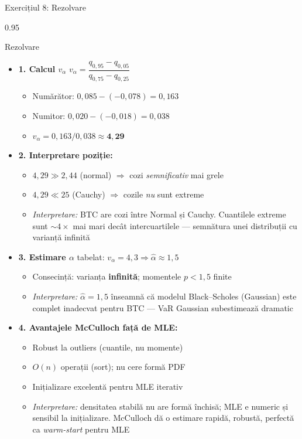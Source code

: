 \documentclass[9pt, aspectratio=169, t]{beamer}
\begin{document}
\begin{frame}[shrink=25]{Exercițiul 8: Rezolvare}
\begin{cminipage}{0.95\textwidth}
\begin{exampleblock}{Rezolvare}
\begin{itemize}\setlength{\itemsep}{0pt}
    \item \textbf{1. Calcul $v_\alpha$} \quad $v_\alpha = \dfrac{q_{0{,}95} - q_{0{,}05}}{q_{0{,}75} - q_{0{,}25}}$
    \begin{itemize}\setlength{\itemsep}{0pt}
        \item Numărător: $0{,}085 - (-0{,}078) = 0{,}163$
        \item Numitor: $0{,}020 - (-0{,}018) = 0{,}038$
        \item $v_\alpha = 0{,}163/0{,}038 \approx \mathbf{4{,}29}$
    \end{itemize}
    \item \textbf{2. Interpretare poziție:}
    \begin{itemize}\setlength{\itemsep}{0pt}
        \item $4{,}29 \gg 2{,}44$ (normal) $\Rightarrow$ cozi \emph{semnificativ} mai grele
        \item $4{,}29 \ll 25$ (Cauchy) $\Rightarrow$ cozile \emph{nu} sunt extreme
        \item \textit{Interpretare:} BTC are cozi între Normal și Cauchy. Cuantilele extreme sunt $\sim 4\times$ mai mari decât intercuartilele --- semnătura unei distribuții cu varianță infinită
    \end{itemize}
    \item \textbf{3. Estimare $\alpha$} \quad tabelat: $v_\alpha = 4{,}3 \Rightarrow \hat\alpha \approx 1{,}5$
    \begin{itemize}\setlength{\itemsep}{0pt}
        \item Consecință: varianța \textbf{infinită}; momentele $p < 1{,}5$ finite
        \item \textit{Interpretare:} $\hat\alpha = 1{,}5$ înseamnă că modelul Black--Scholes (Gaussian) este complet inadecvat pentru BTC --- VaR Gaussian subestimează dramatic
    \end{itemize}
    \item \textbf{4. Avantajele McCulloch față de MLE:}
    \begin{itemize}\setlength{\itemsep}{0pt}
        \item Robust la outliers (cuantile, nu momente)
        \item $O(n)$ operații (sort); nu cere formă PDF
        \item Inițializare excelentă pentru MLE iterativ
        \item \textit{Interpretare:} densitatea stabilă nu are formă închisă; MLE e numeric și sensibil la inițializare. McCulloch dă o estimare rapidă, robustă, perfectă ca \emph{warm-start} pentru MLE
    \end{itemize}
\end{itemize}
\end{exampleblock}
\end{cminipage}
\end{frame}
\end{document}
